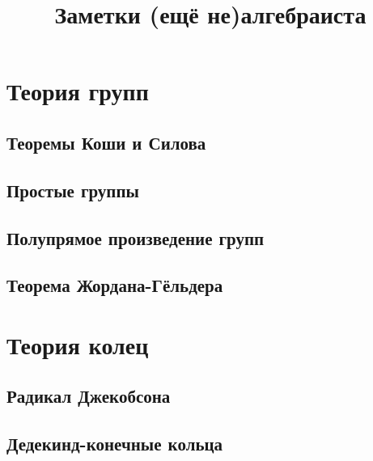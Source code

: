 \documentclass[12pt]{amsart}
\title{Заметки (ещё не)алгебраиста}
\author{}
\numberwithin{theorem}{subsection}
\theoremstyle{definition}
\begin{document}
\maketitle

\tableofcontents

\section{Теория групп}

\subsection{Теоремы Коши и Силова}



\subsection{Простые группы}



\subsection{Полупрямое произведение групп}



\subsection{Теорема Жордана-Гёльдера}



\section{Теория колец}

\subsection{Радикал Джекобсона}



\subsection{Дедекинд-конечные кольца}



\end{document}
